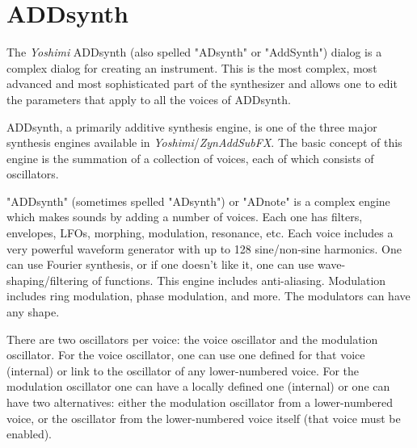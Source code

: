 %
%
%

\section{ADDsynth}
\label{sec:addsynth}

   The \textsl{Yoshimi} ADDsynth (also spelled "ADsynth" or "AddSynth")
   dialog is a complex dialog for creating an
   instrument.  This is the most complex, most advanced and most
   sophisticated part of the synthesizer and allows one to edit the
   parameters that apply to all the voices of ADDsynth.

   ADDsynth, a primarily additive synthesis engine, is one of the three major
   synthesis engines available in \textsl{Yoshimi}/\textsl{ZynAddSubFX}.
   The basic concept of this engine is the summation of a collection of voices,
   each of which consists of oscillators.

   "ADDsynth" (sometimes spelled "ADsynth") or "ADnote" is a complex engine
   which makes sounds by adding a number of voices. Each one has filters,
   envelopes, LFOs, morphing, modulation, resonance, etc.
   Each voice includes a very powerful
   waveform generator with up to 128 sine/non-sine harmonics. One can use
   Fourier synthesis, or if one doesn't like it, one can use
   wave-shaping/filtering of functions. This engine includes anti-aliasing.
   Modulation includes ring modulation, phase modulation, and more.
   The modulators can have any shape.
   \cite{zyndoc}

   There are two oscillators per voice: the  voice
   oscillator and the  modulation oscillator.
   For the voice oscillator, one can use one defined for that voice (internal)
   or link to the oscillator of any lower-numbered voice.  For the modulation
   oscillator one can have a locally defined one (internal) or one can have
   two alternatives: either the modulation oscillator from a lower-numbered
   voice, or the oscillator from the lower-numbered voice itself (that voice
   must be enabled).

